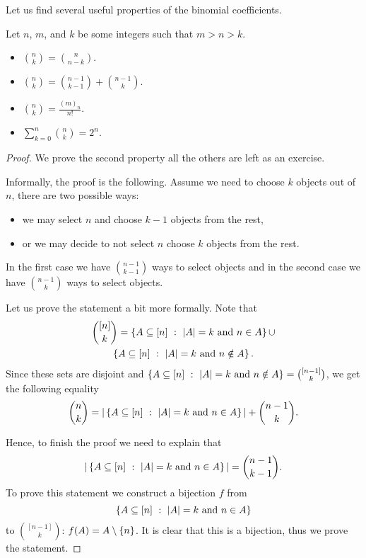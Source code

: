 Let us find several useful properties of the binomial coefficients.
\begin{theorem}
  Let $n$, $m$, and $k$ be some integers such that $m > n > k$.
  \begin{itemize}
    \item $\binom{n}{k} = \binom{n}{n - k}$.
    \item $\binom{n}{k} = \binom{n - 1}{k - 1} + \binom{n - 1}{k}$.
    \item $\binom{n}{k} = \frac{(m)_n}{n!}$.
    \item $\sum_{k = 0}^n \binom{n}{k} = 2^n$.
  \end{itemize}
\end{theorem}
\begin{proof}
  We prove the second property all the others are left as an exercise.

  Informally, the proof is the following. Assume we need to choose $k$ objects
  out of $n$, there are two possible ways:
  \begin{itemize}
    \item we may select $n$ and choose $k - 1$ objects from the rest,
    \item or we may decide to not select $n$ choose $k$ objects from the rest.
  \end{itemize}
  In the first case we have $\binom{n - 1}{k - 1}$ ways to select objects and
  in the second case we have $\binom{n - 1}{k}$ ways to select objects.

  Let us prove the statement a bit more formally. Note that
  \begin{multline*}
    \binom{[n]}{k} = \set[|A| = k \text{ and } n \in A]{A \subseteq [n]} \cup \\
    \set[|A| = k \text{ and } n \notin A]{A \subseteq [n]}.
  \end{multline*}
  Since these sets are disjoint and $\set[|A| = k \text{ and } n \notin A]{A
  \subseteq [n]} = \binom{[n - 1]}{k}$, we get the following equality
  \[
    \binom{n}{k} = |\set[|A| = k \text{ and } n \in A]{A \subseteq [n]}| +
    \binom{n - 1}{k}.
  \]

  Hence, to finish the proof we need to explain that
  \[
    |\set[|A| = k \text{ and } n \in A]{A \subseteq [n]}| =
    \binom{n - 1}{k - 1}.
  \]
  To prove this statement we construct a bijection $f$
  from \[
    \set[|A| = k \text{ and } n \in A]{A \subseteq [n]}
  \] to
  $\binom{[n - 1]}{k}$: $f(A) = A \setminus \set{n}$.
  It is clear that this is a bijection, thus we prove the statement.
\end{proof}

